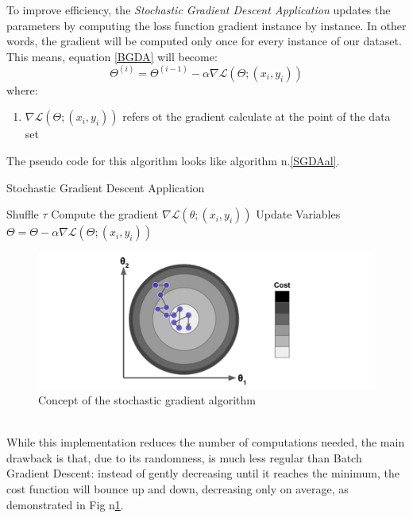 \documentclass[conference]{IEEEtran}
\begin{document}
To improve efficiency, the \textit{Stochastic Gradient Descent Application} updates the parameters by computing the loss function gradient instance by instance. In other words, the gradient will be computed only once for every instance of our dataset. This means, equation \eqref{BGDA} will become:
\begin{equation}
    \Theta^{(i)} = \Theta^{(i-1)} - \alpha\nabla\mathscr{L}(\Theta;(x_i,y_i))\label{eq:SGDA}
\end{equation}
where:
%
\begin{enumerate}
  \item $\nabla\mathscr{L}(\Theta;(x_i,y_i))$ refers ot the gradient calculate at the point of the data set
\end{enumerate}
The pseudo code for this algorithm looks like algorithm n.\ref{SGDAal}. \\
\begin{algorithm}
\caption{Stochastic Gradient Descent Application}\label{SGDAal}
\begin{algorithmic}[1]
\State Shuffle $\tau$
\State Compute the gradient $\nabla\mathscr{L}(\theta;(x_i,y_i))$
\State Update Variables $\Theta = \Theta -\alpha\nabla\mathscr{L}(\Theta;(x_i,y_i))$
\EndFor
\EndFor
{}
\end{algorithmic}
\end{algorithm}
\begin{figure}[htbp]
    \includegraphics[scale=0.65]{Figures/Fig4.png}
    \caption{Concept of the stochastic gradient algorithm\cite{Scikit-Learn}}
    \label{fig:st_grad}
\end{figure}
\\
While this implementation reduces the number of computations needed, the main drawback is that, due to its randomness, is much less regular than Batch Gradient Descent: instead of gently decreasing until it reaches the minimum, the cost function will bounce up and down, decreasing only on average, as demonstrated in Fig n\ref{fig:st_grad}.
\end{document}
